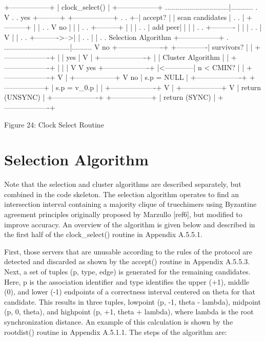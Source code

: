                       +-----------------+
                      | clock_select()  |
                      +-----------------+
................................|...........
.                               V          .
.      yes +---------+ +-----------------+ .
.       +--| accept? | | scan candidates | .
.       |  +---------+ |                 | .
.       V        no |  |                 | .
.  +---------+      |  |                 | .
.  | add peer|      |  |                 | .
.  +----------      |  |                 | .
.       |           V  |                 | .
.       +---------->-->|                 | .
.                      |                 | .
. Selection Algorithm  +-----------------+ .
.................................|..........
                                V
                    no +-------------------+
        +-------------|     survivors?    |
        |             +-------------------+
        |                       | yes
        |                       V
        |             +-------------------+
        |             | Cluster Algorithm |
        |             +-------------------+
        |                       |
        |                       V
        V         yes +-------------------+
        |<------------|     n < CMIN?     |
        |             +-------------------+
        V                       |
  +-----------------+            V no
  |   s.p = NULL    |  +-------------------+
  +-----------------+  |   s.p = v_0.p     |
        |             +-------------------+
        V                       |
  +-----------------+            V
  | return (UNSYNC) |  +-------------------+
  +-----------------+  |   return (SYNC)   |
                      +-------------------+

                  Figure 24: Clock Select Routine

\section{Selection Algorithm}

Note that the selection and cluster algorithms are described
separately, but combined in the code skeleton.  The selection
algorithm operates to find an intersection interval containing a
majority clique of truechimers using Byzantine agreement principles
originally proposed by Marzullo [ref6], but modified to improve
accuracy.  An overview of the algorithm is given below and described
in the first half of the clock_select() routine in Appendix A.5.5.1.

First, those servers that are unusable according to the rules of the
protocol are detected and discarded as shown by the accept() routine
in Appendix A.5.5.3.  Next, a set of tuples (p, type, edge) is
generated for the remaining candidates.  Here, p is the association
identifier and type identifies the upper (+1), middle (0), and lower
(-1) endpoints of a correctness interval centered on theta for that
candidate.  This results in three tuples, lowpoint (p, -1, theta -
lambda), midpoint (p, 0, theta), and highpoint (p, +1, theta +
lambda), where lambda is the root synchronization distance.  An
example of this calculation is shown by the rootdist() routine in
Appendix A.5.1.1.  The steps of the algorithm are:

